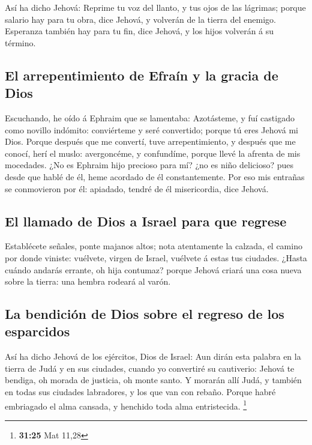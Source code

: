  Así ha dicho Jehová: Reprime tu voz del llanto, y tus ojos
de las lágrimas; porque salario hay para tu obra, dice Jehová, y
volverán de la tierra del enemigo.  Esperanza también hay
para tu fin, dice Jehová, y los hijos volverán á su término.

\hypertarget{el-arrepentimiento-de-efrauxedn-y-la-gracia-de-dios}{%
\subsection{El arrepentimiento de Efraín y la gracia de
Dios}\label{el-arrepentimiento-de-efrauxedn-y-la-gracia-de-dios}}

 Escuchando, he oído á Ephraim que se lamentaba:
Azotásteme, y fuí castigado como novillo indómito: conviérteme y seré
convertido; porque tú eres Jehová mi Dios.  Porque después
que me convertí, tuve arrepentimiento, y después que me conocí, herí el
muslo: avergoncéme, y confundíme, porque llevé la afrenta de mis
mocedades.  ¿No es Ephraim hijo precioso para mí? ¿no es
niño delicioso? pues desde que hablé de él, heme acordado de él
constantemente. Por eso mis entrañas se conmovieron por él: apiadado,
tendré de él misericordia, dice Jehová.

\hypertarget{el-llamado-de-dios-a-israel-para-que-regrese}{%
\subsection{El llamado de Dios a Israel para que
regrese}\label{el-llamado-de-dios-a-israel-para-que-regrese}}

 Establécete señales, ponte majanos altos; nota atentamente
la calzada, el camino por donde viniste: vuélvete, virgen de Israel,
vuélvete á estas tus ciudades.  ¿Hasta cuándo andarás
errante, oh hija contumaz? porque Jehová criará una cosa nueva sobre la
tierra: una hembra rodeará al varón.

\hypertarget{la-bendiciuxf3n-de-dios-sobre-el-regreso-de-los-esparcidos}{%
\subsection{La bendición de Dios sobre el regreso de los
esparcidos}\label{la-bendiciuxf3n-de-dios-sobre-el-regreso-de-los-esparcidos}}

 Así ha dicho Jehová de los ejércitos, Dios de Israel: Aun
dirán esta palabra en la tierra de Judá y en sus ciudades, cuando yo
convertiré su cautiverio: Jehová te bendiga, oh morada de justicia, oh
monte santo.  Y morarán allí Judá, y también en todas sus
ciudades labradores, y los que van con rebaño.  Porque
habré embriagado el alma cansada, y henchido toda alma entristecida.
\footnote{\textbf{31:25} Mat 11,28}

